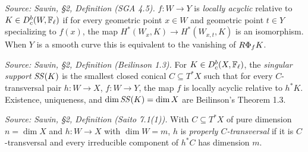 \begin{definition}
  \label{def:sawin_local_acyclic}
  \textit{Source: Sawin, §2, Definition (SGA 4.5).}
  $f:W\to Y$ is \emph{locally acyclic} relative to $K\in D^b_c(W,\mathbb{F}_\ell)$ if for
  every geometric point $x\in W$ and geometric point $t\in Y$ specializing to
  $f(x)$, the map $H^*(W_x,K)\to H^*(W_{x,t},K)$ is an isomorphism.  When $Y$ is a
  smooth curve this is equivalent to the vanishing of $R\Phi_f K$.
\end{definition}

\begin{definition}
  \label{def:sawin_singular_support}
  \textit{Source: Sawin, §2, Definition (Beilinson 1.3).}
  For $K\in D^b_c(X,\mathbb{F}_\ell)$, the \emph{singular support} $\mathit{SS}(K)$ is the
  smallest closed conical $C\subseteq T^*X$ such that for every $C$-transversal
  pair $h:W\to X$, $f:W\to Y$, the map $f$ is locally acyclic relative to $h^*K$.
  Existence, uniqueness, and $\dim \mathit{SS}(K)=\dim X$ are Beilinson's
  Theorem 1.3.
\end{definition}

\begin{definition}
  \label{def:sawin_properly_transversal}
  \textit{Source: Sawin, §2, Definition (Saito 7.1(1)).}
  With $C\subseteq T^*X$ of pure dimension $n=\dim X$ and $h:W\to X$ with
  $\dim W=m$, $h$ is \emph{properly $C$-transversal} if it is $C$-transversal and
  every irreducible component of $h^*C$ has dimension $m$.
\end{definition}

